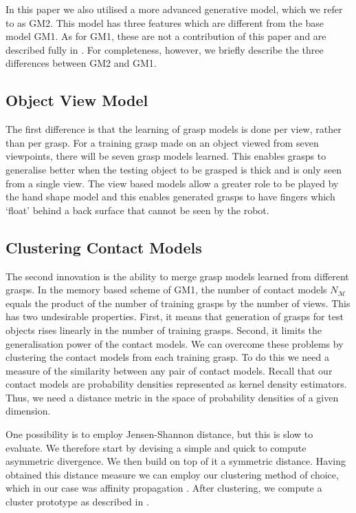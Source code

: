 
In this paper we also utilised a more advanced generative model, which we refer to as GM2. This model has three features which are different from the base model GM1. As for GM1, these are not a contribution of this paper and are described fully in \cite{kopicki2019ijrr}. For completeness, however, we briefly describe the three differences between GM2 and GM1. 

\subsection{Object View Model}\label{sec:representations.object}
The first difference is that the learning of grasp models is done per view, rather than per grasp. For a training grasp made on an object viewed from seven viewpoints, there will be seven grasp models learned. This enables grasps to generalise better when the testing object to be grasped is thick and is only seen from a single view. The view based models allow a greater role to be played by the hand shape model and this enables generated grasps to have fingers which `float' behind a back surface that cannot be seen by the robot.

\subsection{Clustering Contact Models}\label{sec:learning.clustering}

The second innovation is the ability to merge grasp models learned from different grasps. In the memory based scheme of GM1, the number of contact models $N_{\mathcal{M}}$ equals the product of the number of training grasps by the number of views. This has two undesirable properties. First, it means that generation of grasps for test objects rises linearly in the number of training grasps. Second, it limits the generalisation power of the contact models. We can overcome these problems by clustering the contact models from each training grasp. To do this we need a measure of the similarity between any pair of contact models. Recall that our contact models are probability densities represented as kernel density estimators. Thus, we need a distance metric in the space of probability densities of a given dimension.

One possibility is to employ Jensen-Shannon distance, but this is slow to evaluate. We therefore start by devising a simple and quick to compute asymmetric divergence. We then build on top of it a symmetric distance. Having obtained this distance measure we can employ our clustering method of choice, which in our case was affinity propagation \cite{frey2007clustering}. After clustering, we compute a cluster prototype as described in \cite{kopicki2019}.

